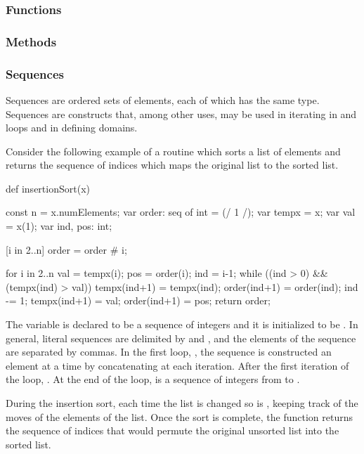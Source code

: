 \subsubsection{Functions}
\label{Intro_Functions}

\subsubsection{Methods}
\label{Intro_Methods}

\subsubsection{Sequences}
\label{Intro_Sequences}

Sequences are ordered sets of elements, each of which has the same type.
Sequences are constructs that, among other uses, may be used in iterating in 
and  loops and in defining domains.  

Consider the following example of a routine which sorts a list 
of elements and returns the sequence of indices which maps the original
list to the sorted list.
\begin{example}
\begin{chapel}
def insertionSort(x) {
  const n = x.numElements;
  var order: seq of int = (/ 1 /);
  var tempx = x;
  var val = x(1);
  var ind, pos: int;

  [i in 2..n] {
    order = order # i;
  }

  for i in 2..n {
    val = tempx(i);
    pos = order(i);
    ind = i-1;
    while ((ind > 0) && (tempx(ind) > val)) {
      tempx(ind+1) = tempx(ind);
      order(ind+1) = order(ind);
      ind -= 1;
    }
    tempx(ind+1) = val;
    order(ind+1) = pos;
  }
  return order;
}
\end{chapel}
\end{example}
The variable  is declared to be a sequence of integers
and it is initialized to be .  In general, literal
sequences are delimited by \chpl{(/} and \chpl{/)}, and the elements of
the sequence are separated by commas.  In the first loop, \chpl{[i in 2..n]},
the sequence  is constructed an element at a time by concatenating
 at each iteration.  After the first iteration of the loop, 
.  At the end of the loop,  is a sequence
of integers from  to .

During the insertion sort, each time the list is changed so is ,
keeping track of the moves of the elements of the list.  Once the sort is
complete, the function returns the sequence of indices that would permute
the original unsorted list into the sorted list.

